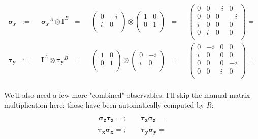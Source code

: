 \documentclass[solutions.tex]{subfiles}
\begin{document}
\begin{equation*}\begin{aligned}
	\bm{\sigma_y} &:=&& \bm{\sigma_y}^A\otimes\bm{I}^B &=&&
	\begin{pmatrix}
		0 & -i \\
		i & 0 \\
	\end{pmatrix}\otimes\begin{pmatrix}
		1 & 0 \\
		0 & 1 \\
	\end{pmatrix} &=&& \begin{pmatrix}
		0 & 0 & -i  & 0  \\
		0 & 0 & 0  & -i  \\
		i & 0 & 0  & 0  \\
		0 & i & 0  & 0  \\
	\end{pmatrix} =  \\
	\bm{\tau_y} &:=&& \bm{I}^A\otimes\bm{\tau_y}^B &=&&
	\begin{pmatrix}
		1 & 0 \\
		0 & 1 \\
	\end{pmatrix}\otimes\begin{pmatrix}
		0 & -i \\
		i & 0 \\
	\end{pmatrix} &=&& \begin{pmatrix}
		0 & -i & 0  & 0  \\
		i & 0 & 0  & 0  \\
		0 & 0 & 0  & -i  \\
		0 & 0 & i  & 0  \\
	\end{pmatrix} =  \\
\end{aligned}\end{equation*}

We'll also need a few more "combined" observables. I'll skip the manual
matrix multiplication here: those have been automatically computed
by \textit{R}:

\[
	\bm{\sigma_z}\bm{\tau_z} = ;\qquad
	\bm{\tau_z}\bm{\sigma_z} = 
\]

\[
	\bm{\tau_x}\bm{\sigma_x} = ;\qquad
	\bm{\tau_y}\bm{\sigma_y} = 
\]
\end{document}
